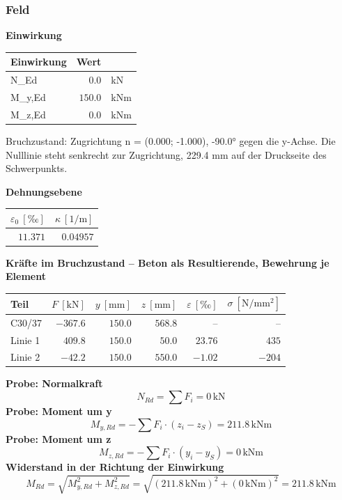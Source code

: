 \documentclass[11pt,a4paper]{article}
\begin{document}
\subsubsection{Feld}
\noindent\textbf{Einwirkung}
\begin{longtable}{lrl}
\hline
Einwirkung & Wert &  \\
\hline
\endhead
N\_Ed & $0.0$ & kN \\
M\_y,Ed & $150.0$ & kNm \\
M\_z,Ed & $0.0$ & kNm \\
\hline
\end{longtable}
Bruchzustand: Zugrichtung n = (0.000; -1.000), -90.0° gegen die y-Achse. Die Nulllinie steht senkrecht zur Zugrichtung, 229.4 mm auf der Druckseite des Schwerpunkts.

\noindent\textbf{Dehnungsebene}
\begin{longtable}{rr}
\hline
$\varepsilon_0\ [\text{‰}]$ & $\kappa\ [\mathrm{1/m}]$ \\
\hline
\endhead
$11.371$ & $0.04957$ \\
\hline
\end{longtable}
\noindent\textbf{Kräfte im Bruchzustand -- Beton als Resultierende, Bewehrung je Element}
\begin{longtable}{lrrrrr}
\hline
Teil & $F\ [\mathrm{kN}]$ & $y\ [\mathrm{mm}]$ & $z\ [\mathrm{mm}]$ & $\varepsilon\ [\text{‰}]$ & $\sigma\ [\mathrm{N/mm^2}]$ \\
\hline
\endhead
C30/37 & $-367.6$ & $150.0$ & $568.8$ & – & – \\
Linie 1 & $409.8$ & $150.0$ & $50.0$ & $23.76$ & $435$ \\
Linie 2 & $-42.2$ & $150.0$ & $550.0$ & $-1.02$ & $-204$ \\
\hline
\end{longtable}
\noindent\textbf{Probe: Normalkraft}
\begin{equation*}
N_{Rd} = \sum F_i = 0\,\mathrm{kN}
\end{equation*}
\noindent\textbf{Probe: Moment um y}
\begin{equation*}
M_{y,Rd} = -\sum F_i \cdot (z_i - z_S) = 211.8\,\mathrm{kNm}
\end{equation*}
\noindent\textbf{Probe: Moment um z}
\begin{equation*}
M_{z,Rd} = -\sum F_i \cdot (y_i - y_S) = 0\,\mathrm{kNm}
\end{equation*}
\noindent\textbf{Widerstand in der Richtung der Einwirkung}
\begin{equation*}
M_{Rd} = \sqrt{M_{y,Rd}^{2} + M_{z,Rd}^{2}} = \sqrt{\left(211.8\,\mathrm{kNm}\right)^{2} + \left(0\,\mathrm{kNm}\right)^{2}} = 211.8\,\mathrm{kNm}
\end{equation*}
\end{document}
